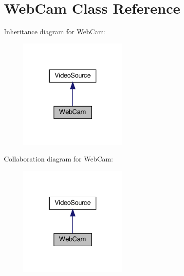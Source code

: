\section{Web\+Cam Class Reference}
\label{class_web_cam}


Inheritance diagram for Web\+Cam\+:
\nopagebreak
\begin{figure}[H]
\begin{center}
\leavevmode
\includegraphics[width=152pt]{class_web_cam__inherit__graph}
\end{center}
\end{figure}


Collaboration diagram for Web\+Cam\+:
\nopagebreak
\begin{figure}[H]
\begin{center}
\leavevmode
\includegraphics[width=152pt]{class_web_cam__coll__graph}
\end{center}
\end{figure}
